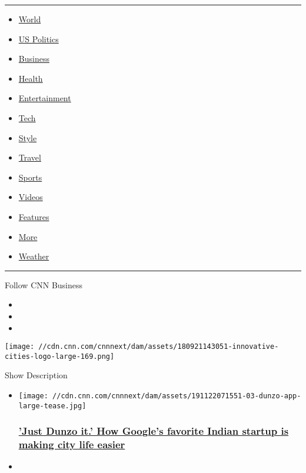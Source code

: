 \begin{center}\rule{0.5\linewidth}{\linethickness}\end{center}

\begin{itemize}
\tightlist
\item
  \href{/world}{World}
\item
  \href{/politics}{US Politics}
\item
  \href{/business}{Business}
\item
  \href{/health}{Health}
\item
  \href{/entertainment}{Entertainment}
\item
  \href{/business/tech}{Tech}
\item
  \href{/style}{Style}
\item
  \href{/travel}{Travel}
\item
  \href{/sport}{Sports}
\item
  \href{/videos}{Videos}
\item
  \href{/specials}{Features}
\item
  \href{/more}{More}
\item
  \href{/weather}{Weather}
\end{itemize}

\begin{center}\rule{0.5\linewidth}{\linethickness}\end{center}

Follow CNN Business

\begin{itemize}
\item
\item
\item
\end{itemize}

\texttt{[image: //cdn.cnn.com/cnnnext/dam/assets/180921143051-innovative-cities-logo-large-169.png]}

Show Description

\begin{itemize}
\item
  \href{/2019/11/28/tech/dunzo-india-app-google/index.html}{}

  \texttt{[image: //cdn.cnn.com/cnnnext/dam/assets/191122071551-03-dunzo-app-large-tease.jpg]}

  \hypertarget{just-dunzo-it-how-googles-favorite-indian-startup-is-making-city-life-easier}{%
  \subsubsection{\texorpdfstring{\href{/2019/11/28/tech/dunzo-india-app-google/index.html}{'Just
  Dunzo it.' How Google's favorite Indian startup is making city life
  easier}}{'Just Dunzo it.' How Google's favorite Indian startup is making city life easier}}\label{just-dunzo-it-how-googles-favorite-indian-startup-is-making-city-life-easier}}
\item
\end{itemize}

